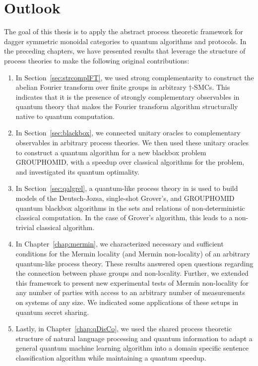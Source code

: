\chapter{Outlook}
\label{chap:outlook}

The goal of this thesis is to apply the abstract process theoretic framework for dagger symmetric monoidal categories to quantum algorithms and protocols.  In the preceding chapters, we have presented results that leverage the structure of process theories to make the following original contributions:
\begin{enumerate}
\item In Section~\ref{sec:strcomplFT}, we used strong complementarity to construct the abelian Fourier transform over finite groups in arbitrary $\dagger$-SMCs. This indicates that it is the presence of strongly complementary observables in quantum theory that makes the Fourier transform algorithm structurally native to quantum computation.

\item In Section~\ref{sec:blackbox}, we connected unitary oracles to complementary observables in arbitrary process theories. We then used these unitary oracles to construct a quantum algorithm for a new blackbox problem GROUPHOMID, with a speedup over classical algorithms for the problem, and investigated its quantum optimality.

\item In Section~\ref{sec:qalgrel}, a quantum-like process theory in  is used to build models of the Deutsch-Jozsa, single-shot Grover's, and GROUPHOMID quantum blackbox algorithms in the sets and relations of non-deterministic classical computation. In the case of Grover's algorithm, this leads to a non-trivial classical algorithm.

\item In Chapter~\ref{chap:mermin}, we characterized necessary and sufficient conditions for the Mermin locality (and Mermin non-locality) of an arbitrary quantum-like process theory. These results answered open questions regarding the connection between phase groups and non-locality. Further, we extended this framework to present new experimental tests of Mermin non-locality for any number of parties with access to an arbitrary number of measurements on systems of any size. We indicated some applications of these setups in quantum secret sharing.

\item Lastly, in Chapter~\ref{chap:qDisCo}, we used the shared process theoretic structure of natural language processing and quantum information to adapt a general quantum machine learning algorithm into a domain specific sentence classification algorithm while maintaining a quantum speedup.
\end{enumerate}

